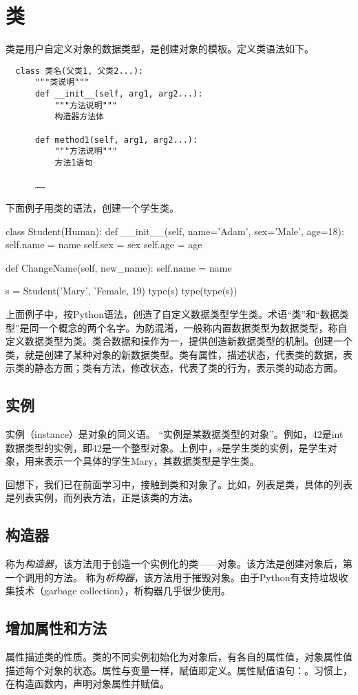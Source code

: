 \section{类}
类是用户自定义对象的数据类型，是创建对象的模板。定义类语法如下。
\begin{framed}
\begin{verbatim}
  class 类名(父类1, 父类2...):
      """类说明"""
      def __init__(self, arg1, arg2...):
          """方法说明"""
          构造器方法体

      def method1(self, arg1, arg2...):
          """方法说明"""
          方法1语句

      ……
\end{verbatim}
\end{framed}
下面例子用类的语法，创建一个学生类。
\begin{python}
class Student(Human): 
    def __init__(self, name='Adam', sex='Male', age=18):
        self.name = name
        self.sex = sex
        self.age = age

    def ChangeName(self, new_name):
        self.name = name
         
s = Student('Mary', 'Female, 19)
type(s)
type(type(s))
\end{python}
上面例子中，按Python语法，创造了自定义数据类型学生类。术语“类”和“数据类型”是同一个概念的两个名字。为防混淆，一般称内置数据类型为数据类型，称自定义数据类型为类。类合数据和操作为一，提供创造新数据类型的机制。创建一个类，就是创建了某种对象的新数据类型。类有属性，描述状态，代表类的数据，表示类的静态方面；类有方法，修改状态，代表了类的行为，表示类的动态方面。
\subsection{实例}
实例（instance）是对象的同义语。 “实例是某数据类型的对象”。例如，42是int数据类型的实例，即42是一个整型对象。上例中，s是学生类的实例，是学生对象，用来表示一个具体的学生Mary，其数据类型是学生类。

回想下，我们已在前面学习中，接触到类和对象了。比如，列表是类，具体的列表是列表实例，而列表方法，正是该类的方法。
\subsection{构造器}
称为\emph{构造器}，该方法用于创造一个实例化的类——对象。该方法是创建对象后，第一个调用的方法。
称为\emph{析构器}，该方法用于摧毁对象。由于Python有支持垃圾收集技术（garbage collection），析构器几乎很少使用。
\subsection{增加属性和方法}
属性描述类的性质。类的不同实例初始化为对象后，有各自的属性值，对象属性值描述每个对象的状态。属性与变量一样，赋值即定义。属性赋值语句：。习惯上，在构造函数内，声明对象属性并赋值。

